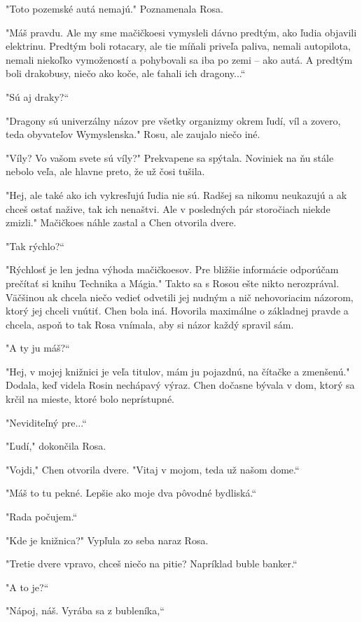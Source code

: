 \documentclass{book}
\begin{document}
"$ $Toto pozemské autá nemajú."$ $ Poznamenala Rosa.

"$ $Máš pravdu. Ale my sme mačičkoesi vymysleli dávno predtým, ako ľudia objavili elektrinu. Predtým boli rotacary, ale tie míňali priveľa paliva, nemali autopilota, nemali niekoľko vymožeností a pohybovali sa iba po zemi – ako autá. A predtým boli drakobusy, niečo ako koče, ale ťahali ich dragony...“

"$ $Sú aj draky?“

"$ $Dragony sú univerzálny názov pre všetky organizmy okrem ľudí, víl a zovero, teda obyvateľov Wymyslenska."$ $ Rosu, ale zaujalo niečo iné.

"$ $Víly? Vo vašom svete sú víly?"$ $ Prekvapene sa spýtala. Noviniek na ňu stále nebolo veľa, ale hlavne preto, že už čosi tušila.

"$ $Hej, ale také ako ich vykresľujú ľudia nie sú. Radšej sa nikomu neukazujú a ak chceš ostať nažive, tak ich nenaštvi. Ale v posledných pár storočiach niekde zmizli."$ $ Mačičkoes náhle zastal a Chen otvorila dvere.

"$ $Tak rýchlo?“

"$ $Rýchlosť je len jedna výhoda mačičkoesov. Pre bližšie informácie odporúčam prečítať si knihu Technika a Mágia."$ $ Takto sa s Rosou ešte nikto nerozprával. Väčšinou ak chcela niečo vedieť odvetili jej nudným a nič nehovoriacim názorom, ktorý jej chceli vnútiť. Chen bola iná. Hovorila maximálne o základnej pravde a chcela, aspoň to tak Rosa vnímala, aby si názor každý spravil sám.

"$ $A ty ju máš?“

"$ $Hej, v mojej knižnici je veľa titulov, mám ju pojazdnú, na čítačke a zmenšenú."$ $ Dodala, keď videla Rosin nechápavý výraz. Chen dočasne bývala v dom, ktorý sa krčil na mieste, ktoré bolo neprístupné.

"$ $Neviditeľný pre...“

"$ $Ľudí,"$ $ dokončila Rosa.

"$ $Vojdi,"$ $ Chen otvorila dvere. "$ $Vitaj v mojom, teda už našom dome.“

"$ $Máš to tu pekné. Lepšie ako moje dva pôvodné bydliská.“

"$ $Rada počujem.“

"$ $Kde je knižnica?"$ $ Vypľula zo seba naraz Rosa.

"$ $Tretie dvere vpravo, chceš niečo na pitie? Napríklad buble banker.“

"$ $A to je?“

"$ $Nápoj, náš. Vyrába sa z bubleníka,“
\end{document}
